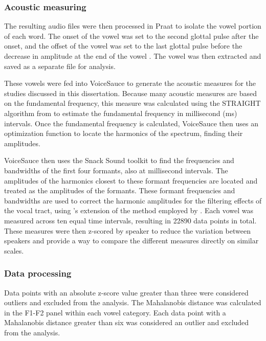 \subsubsection{Acoustic measuring} \label{sec:acoustics}

The resulting audio files were then processed in Praat to isolate the vowel portion of each word. The onset of the vowel was set to the second glottal pulse after the onset, and the offset of the vowel was set to the last glottal pulse before the decrease in amplitude at the end of the vowel \citep{garellekAcousticDiscriminabilityComplex2020}. The vowel was then extracted and saved as a separate file for analysis.

These vowels were fed into VoiceSauce \citep{shueVoiceSauceProgramVoice2011} to generate the acoustic measures for the studies discussed in this dissertation. Because many acoustic measures are based on the fundamental frequency, this measure was calculated using the STRAIGHT algorithm from \citep{kawaharaInstantaneousfrequencybasedPitchExtraction1998} to estimate the fundamental frequency in millisecond (ms) intervals. Once the fundamental frequency is calculated, VoiceSauce then uses an optimization function to locate the harmonics of the spectrum, finding their amplitudes.

VoiceSauce then uses the Snack Sound toolkit \citep{sjolanderSnackSoundToolkit2004} to find the frequencies and bandwidths of the first four formants, also at millisecond intervals. The amplitudes of the harmonics closest to these formant frequencies are located and treated as the amplitudes of the formants. These formant frequencies and bandwidths are used to correct the harmonic amplitudes for the filtering effects of the vocal tract, using \citeauthor{iseliAgeSexVowel2007}'s \citeyear{iseliAgeSexVowel2007} extension of the method employed by \citet{hansonGlottalCharacteristicsFemale1997}. Each vowel was measured across ten equal time intervals, resulting in 22890 data points in total. These measures were then z-scored by speaker to reduce the variation between speakers and provide a way to compare the different measures directly on similar scales.

\subsubsection{Data processing} \label{sec:data_processing}
Data points with an absolute z-score value greater than three were considered outliers and excluded from the analysis. The Mahalanobis distance was calculated in the F1-F2 panel within each vowel category. Each data point with a Mahalanobis distance greater than six was considered an outlier and excluded from the analysis.  

